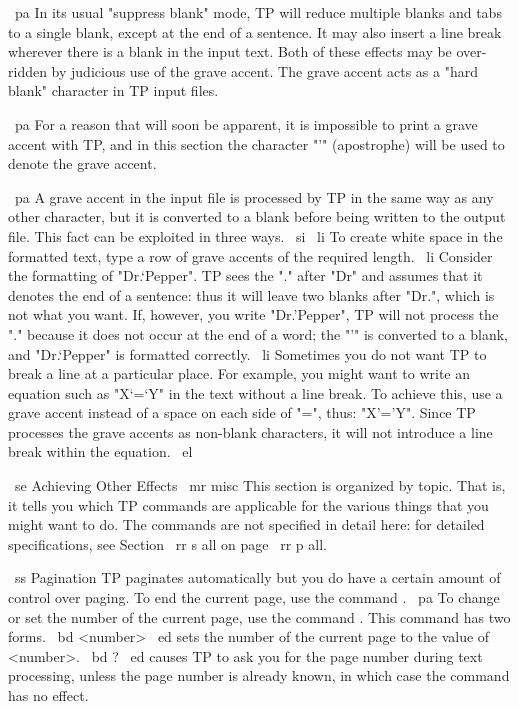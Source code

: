 ~pa In its usual "suppress blank" mode, TP will reduce multiple blanks and
tabs to a single blank, except at the end of a sentence.
It may also insert a line break wherever there is a blank in the input text.
Both of these effects may be over-ridden by judicious use of the grave accent.
The grave accent acts as a "hard blank" character in TP input files.

~pa For a reason that will soon be apparent, it is impossible to print
a grave accent with TP, and in this section the character "'" 
(apostrophe) will be used to denote the grave accent.

~pa A grave accent in the input file is processed by TP in the same
way as any other character, but it is converted to a blank before
being written to the output file.
This fact can be exploited in three ways.
~si
~li To create white space in the formatted text, type a row of grave
accents of the required length.
~li Consider the formatting of "Dr.`Pepper".
TP sees the "." after "Dr" and assumes that it denotes the end of a
sentence: thus it will leave two blanks after "Dr.", which is not
what you want.
If, however, you write "Dr.'Pepper", TP will not process the "."
because it does not occur at the end of a word; the "'" is converted
to a blank, and "Dr.`Pepper" is formatted correctly.
~li Sometimes you do not want TP to break a line at a particular
place.
For example, you might want to write an equation such as "X`=`Y"
in the text without a line break.
To achieve this, use a grave accent instead of a space on each side of
"=", thus: "X'='Y".
Since TP processes the grave accents as non-blank characters, it will
not introduce a line break within the equation.
~el

~se Achieving Other Effects
~mr misc
This section is organized by topic.
That is, it tells you which TP commands are applicable for the various things
that you might want to do.
The commands are not specified in detail here: for detailed specifications,
see Section ~rr s all on page ~rr p all.

~ss Pagination
TP paginates automatically but you do have a certain amount of control
over paging.
To end the current page, use the command \EP.
~pa To change or set the number of the current page, use the command
\GP.
This command has two forms.
~bd \GP <number> ~ed
sets the number of the current page to the value of <number>.
~bd \GP ? ~ed
causes TP to ask you for the page number during text processing,
unless the page number is already known, in which case the command
has no effect.

